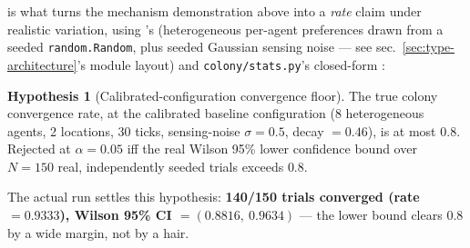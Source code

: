 \documentclass[
  english,
]{article}
\theoremstyle{definition}
\newtheorem{hypothesis}[theorem]{Hypothesis}
\begin{document}
 is what
turns the mechanism demonstration above into a \emph{rate} claim under
realistic variation, using 's
 (heterogeneous per-agent preferences drawn
from a seeded \texttt{random.Random}, plus seeded Gaussian sensing noise
--- see sec.~\ref{sec:type-architecture}'s module layout) and
\texttt{colony/stats.py}'s closed-form :

\begin{hypothesis}[Calibrated-configuration convergence floor]
The true colony convergence rate, at the calibrated baseline configuration (8 heterogeneous agents,
2 locations, 30 ticks, sensing-noise \(\sigma=0.5\), decay \(=0.46\)), is at most \(0.8\). Rejected at
\(\alpha=0.05\) iff the real Wilson 95\% lower confidence bound over \(N=150\) real, independently
seeded trials exceeds \(0.8\).
\end{hypothesis}

The actual run settles this hypothesis: \textbf{140/150 trials converged
(rate \(=0.9333\)), Wilson 95\% CI \(=(0.8816,\ 0.9634)\)} --- the lower
bound clears \(0.8\) by a wide margin, not by a hair.
\end{document}
